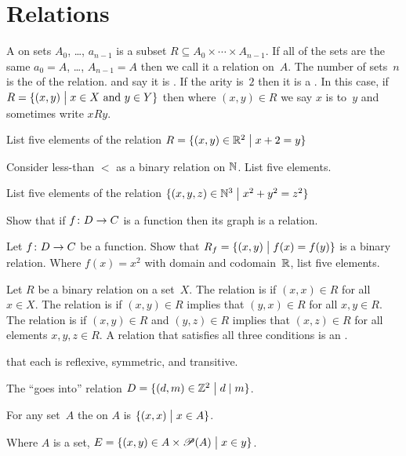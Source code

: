 \documentclass{ibl}
\begin{document}
\section{Relations}
\begin{df}
A  on sets $A_0$, \ldots, $a_{n-1}$ is a subset
$R\subseteq A_0\times \cdots \times A_{n-1}$. 
If all of the sets are the same $a_0=A$, \ldots, $A_{n-1}=A$
then we call it a relation on~$A$.
The number of sets~$n$ is the  of the relation.
and say it is .
If the arity is~$2$ then it is a .
In this case, if $R=\{(x,y) \bigm| \text{$x\in X$ and $y\in Y$}\}$
then where $(x,y)\in R$ we say $x$ is  to~$y$
and sometimes write $xRy$.
\end{df}

\begin{ex}
\begin{exes}
\item List five elements of the relation
  $R=\{(x,y)\in \mathbb{R}^2 \bigm| x+2=y\}$
\item Consider less-than $<$ as a binary relation on $\mathbb{N}$.
  List five elements.
\item List five elements of the relation
  $\{(x,y,z)\in\mathbb{N}^3 \bigm| x^2+y^2=z^2\}$
\item Show that if $\mbox{$f\colon D\to C$}$ is a function then 
  its graph is a relation.
\item Let $\mbox{$f\colon D\to C$}$ be a function.
  Show that 
  $R_f=\{(x,y) \bigm| f(x)=f(y)\}$
  is a binary relation.
  Where $f(x)=x^2$ with domain and codomain~$\mathbb{R}$,
  list five elements. 
\end{exes}
\end{ex}

\begin{df} 
Let $R$ be a binary relation on a set~$X$.
The relation is  if $(x,x)\in R$ for all $x\in X$.
The relation is  if $(x,y)\in R$ implies that
$(y,x)\in R$ for all $x,y\in R$.
The relation is  if 
$(x,y)\in R$ and $(y,z)\in R$ implies that 
$(x,z)\in R$ for all elements $x,y,z\in R$.
A relation that satisfies all three conditions is an
.  
\end{df}

\begin{ex}   \pord{} that each is reflexive, symmetric, and transitive.
\begin{exes}
\item The ``goes into'' relation
  $D=\{(d,m)\in\mathbb{Z}^2 \bigm| d\mid m\}$.
\item
  For any set~$A$ the  on $A$ 
  is $\{(x,x) \bigm| x\in A\}$. 
\item
  Where $A$ is a set,
  $E=\{(x,y)\in A\times\mathscr{P}(A) \bigm| x\in y\}$.
\end{exes}
\end{ex}
\end{document}
